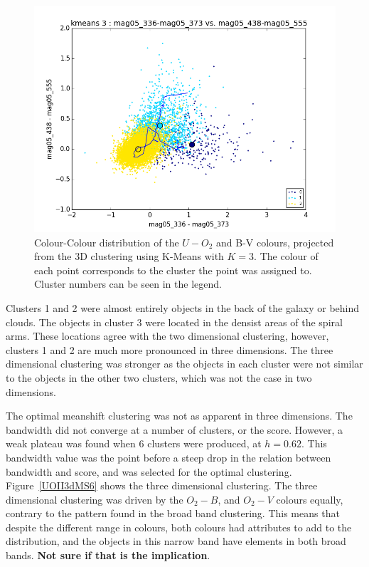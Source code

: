 \begin{figure}
\centering
\includegraphics[width=\linewidth]{figs/successful/kmeans_base_color_3cl_mag05_336-mag05_373vsmag05_438-mag05_555}
\caption{Colour-Colour distribution of the $U-O_{2}$ and B-V colours, projected from the 3D clustering using K-Means with $K=3$. The colour of each point corresponds to the cluster the point was assigned to. Cluster numbers can be seen in the legend.}
\label{fig:UOIIKM2d_proj}
\end{figure}

Clusters 1 and 2 were almost entirely objects in the back of the galaxy or behind clouds.
The objects in cluster 3 were located in the densist areas of the spiral arms.
These locations agree with the two dimensional clustering, however, clusters 1 and 2 are much more pronounced in three dimensions.
The three dimensional clustering was stronger as the objects in each cluster were not similar to the objects in the other two clusters, which was not the case in two dimensions.

The optimal meanshift clustering was not as apparent in three dimensions.
The bandwidth did not converge at a number of clusters, or the score.
However, a weak plateau was found when 6 clusters were produced, at $h = 0.62$.
This bandwidth value was the point before a steep drop in the relation between bandwidth and score, and was selected for the optimal clustering.
Figure~\ref{UOII3dMS6} shows the three dimensional clustering. 
The three dimensional clustering was driven by the $O_{2} - B$, and $O_{2} - V$ colours equally, contrary to the pattern found in the broad band clustering.
This means that despite the different range in colours, both colours had attributes to add to the distribution, and the objects in this narrow band have elements in both broad bands. 
\textbf{Not sure if that is the implication}. 

